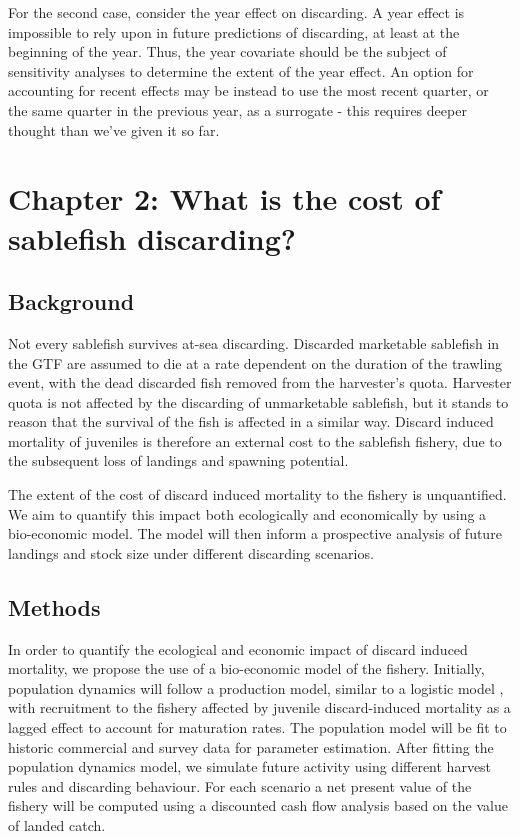 \documentclass{article}
\begin{document}
For the second case, consider the year effect on discarding. A year effect is impossible to rely upon in future predictions of discarding, at least at the beginning of the year. Thus, the year covariate should be the subject of sensitivity analyses to determine the extent of the year effect. An option for accounting for recent effects may be instead to use the most recent quarter, or the same quarter in the previous year, as a surrogate - this requires deeper thought than we've given it so far.


\section{Chapter 2: What is the cost of sablefish discarding?}\label{sec:economics}
    
\subsection{Background}

Not every sablefish survives at-sea discarding. Discarded marketable sablefish in the GTF are assumed to die at a rate dependent on the duration of the trawling event, with the dead discarded fish removed from the harvester's quota. Harvester quota is not affected by the discarding of unmarketable sablefish, but it stands to reason that the survival of the fish is affected in a similar way. Discard induced mortality of juveniles is therefore an external cost to the sablefish fishery, due to the subsequent loss of landings and spawning potential.

The extent of the cost of discard induced mortality to the fishery is unquantified. We aim to quantify this impact both ecologically and economically by using a bio-economic model. The model will then inform a prospective analysis of future landings and stock size under different discarding scenarios.

\subsection{Methods}

In order to quantify the ecological and economic impact of discard induced mortality, we propose the use of a bio-economic model of the fishery. Initially, population dynamics will follow a production model, similar to a logistic model \citep{schaefer1957some}, with recruitment to the fishery affected by juvenile discard-induced mortality as a lagged effect to account for maturation rates. The population model will be fit to historic commercial and survey data for parameter estimation. After fitting the population dynamics model, we simulate future activity using different harvest rules and discarding behaviour. For each scenario a net present value of the fishery will be computed using a discounted cash flow analysis based on the value of landed catch.
\end{document}
